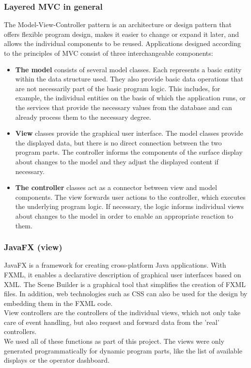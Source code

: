 \subsubsection{Layered MVC in general}
The Model-View-Controller pattern is an architecture or design pattern that offers flexible program design, makes it easier to change or expand it later, and allows the individual components to be reused.
Applications designed according to the principles of MVC consist of three interchangeable components:

\begin{itemize}
	\item \textbf{The model} consists of several model classes. Each represents a basic entity within the data structure used. They also provide basic data operations that are not necessarily part of the basic program logic. This includes, for example, the individual entities on the basis of which the application runs, or the services that provide the necessary values from the database and can already process them to the necessary degree.
	
	\item \textbf{View} classes provide the graphical user interface. The model classes provide the displayed data, but there is no direct connection between the two program parts. The controller informs the components of the surface display about changes to the model and they adjust the displayed content if necessary.
	
	\item \textbf{The controller} classes act as a connector between view and model components. The view forwards user actions to the controller, which executes the underlying program logic. If necessary, the logic informs individual views about changes to the model in order to enable an appropriate reaction to them.
\end{itemize}

\subsubsection{JavaFX (view)}
JavaFX is a framework for creating cross-platform Java applications. With FXML, it enables a declarative description of graphical user interfaces based on XML. The Scene Builder is a graphical tool that simplifies the creation of FXML files. In addition, web technologies such as CSS can also be used for the design by embedding them in the FXML code. \\
View controllers are the controllers of the individual views, which not only take care of event handling, but also request and forward data from the 'real' controllers. \\
We used all of these functions as part of this project. The views were only generated programmatically for dynamic program parts, like the list of available displays or the operator dashboard.


